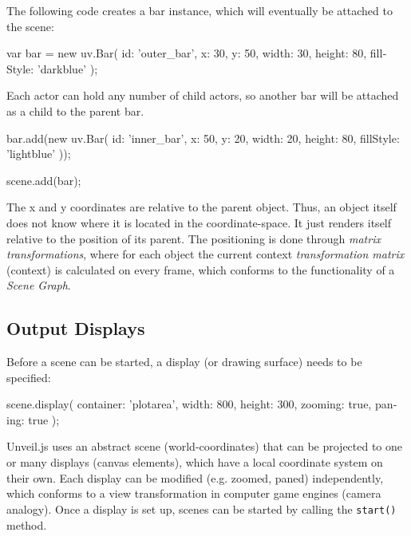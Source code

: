 \begin{english}
\SuperPar The following code creates a bar instance, which will eventually be attached to the scene:


\begin{program}
\begin{CppSourceCode}
var bar = new uv.Bar({
  id: 'outer_bar',
  x: 30,
  y: 50,
  width: 30,
  height: 80,
  fillStyle: 'darkblue'
});
\end{CppSourceCode}
\end{program}


\SuperPar Each actor can hold any number of child actors, so another bar will be attached as a child to the parent bar.

\begin{program}
\begin{CppSourceCode}
bar.add(new uv.Bar({
  id: 'inner_bar',
  x: 50,
  y: 20,
  width: 20,
  height: 80,
  fillStyle: 'lightblue'
}));

scene.add(bar);
\end{CppSourceCode}
\end{program}


\SuperPar The x and y coordinates are relative to the parent object. Thus, an object itself does not know where it is located in the coordinate-space. It just renders itself relative to the position of its parent. The positioning is done through \emph{matrix transformations}, where for each object the current context \emph{transformation matrix} (context) is calculated on every frame, which conforms to the functionality of a \emph{Scene Graph}.

\subsection{Output Displays}

Before a scene can be started, a display (or drawing surface) needs to be specified:

\begin{program}
\begin{CppSourceCode}
scene.display({
  container: 'plotarea',
  width: 800,
  height: 300,
  zooming: true,
  paning: true
});
\end{CppSourceCode}
\end{program}

\SuperPar Unveil.js uses an abstract scene (world-coordinates) that can be projected to one or many displays (canvas elements), which have a local coordinate system on their own. Each display can be modified (e.g. zoomed, paned) independently, which conforms to a view transformation in computer game engines (camera analogy). Once a display is set up, scenes can be started by calling the \texttt{start()} method.



\end{english}
